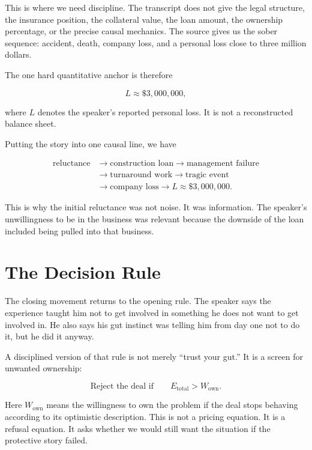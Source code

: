 This is where we need discipline. The transcript does not give the legal structure, the insurance position, the collateral value, the loan amount, the ownership percentage, or the precise causal mechanics. The source gives us the sober sequence: accident, death, company loss, and a personal loss close to three million dollars.

The one hard quantitative anchor is therefore

\begin{equation}
L \approx \text{\$}3{,}000{,}000,
\end{equation}

where \(L\) denotes the speaker's reported personal loss. It is not a reconstructed balance sheet.

Putting the story into one causal line, we have

\begin{equation}
\begin{aligned}
\text{reluctance}
&\to
\text{construction loan}
\to
\text{management failure} \\
&\to
\text{turnaround work}
\to
\text{tragic event} \\
&\to
\text{company loss}
\to
L \approx \text{\$}3{,}000{,}000.
\end{aligned}
\end{equation}

This is why the initial reluctance was not noise. It was information. The speaker's unwillingness to be in the business was relevant because the downside of the loan included being pulled into that business.

\section{The Decision Rule}

The closing movement returns to the opening rule. The speaker says the experience taught him not to get involved in something he does not want to get involved in. He also says his gut instinct was telling him from day one not to do it, but he did it anyway.

A disciplined version of that rule is not merely ``trust your gut.'' It is a screen for unwanted ownership:

\begin{equation}
\text{Reject the deal if}
\qquad
E_{\text{total}} > W_{\text{own}}.
\end{equation}

Here \(W_{\text{own}}\) means the willingness to own the problem if the deal stops behaving according to its optimistic description. This is not a pricing equation. It is a refusal equation. It asks whether we would still want the situation if the protective story failed.

